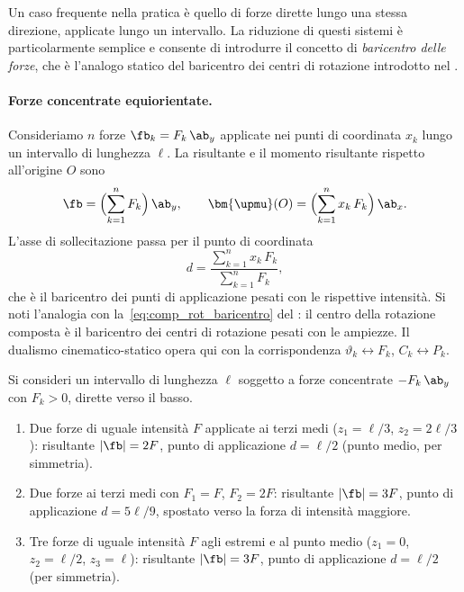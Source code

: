 Un caso frequente nella pratica  è quello di forze
dirette lungo una stessa direzione, applicate lungo un
intervallo. La riduzione di questi sistemi è particolarmente
semplice e consente di introdurre il concetto di
\textit{baricentro delle forze}, che è l'analogo statico del
baricentro dei centri di rotazione introdotto nel .

\paragraph{Forze concentrate equiorientate.}
Consideriamo $n$ forze $\fb_k = F_k\,\ab_y$ applicate nei
punti di coordinata $x_k$ lungo un intervallo di lunghezza
$\ell$. La risultante e il momento risultante rispetto
all'origine $O$ sono
\begin{equation}
	\fb = \Bigl(\sum_{k=1}^{n} F_k\Bigr)\,\ab_y, \qquad
	\bm{\upmu}(O) = \Bigl(\sum_{k=1}^{n} x_k\,F_k\Bigr)
	\,\ab_x.
\end{equation}
L'asse di sollecitazione passa per il punto di coordinata
\begin{equation}\label{eq:baricentro_forze}
	d = \frac{\displaystyle\sum_{k=1}^{n} x_k\,F_k}
	{\displaystyle\sum_{k=1}^{n} F_k},
\end{equation}
che è il baricentro dei punti di applicazione pesati con le
rispettive intensità. Si noti l'analogia con
la~\eqref{eq:comp_rot_baricentro} del : il
centro della rotazione composta è il baricentro dei centri
di rotazione pesati con le ampiezze. Il dualismo
cinematico-statico opera qui con la corrispondenza
$\vartheta_k \leftrightarrow F_k$,
$C_k \leftrightarrow P_k$.

\begin{esempio}
	Si consideri un intervallo di lunghezza $\ell$ soggetto a
	forze concentrate $-F_k\,\ab_y$ con $F_k > 0$, dirette verso
	il basso.
	\begin{enumerate}[label=(\alph*)]
		\item Due forze di uguale intensità $F$ applicate ai
		terzi medi ($z_1 = \ell/3$, $z_2 = 2\ell/3$):
		risultante $|\fb| = 2F$, punto di applicazione
		$d = \ell/2$ (punto medio, per simmetria).
		\item Due forze ai terzi medi con $F_1 = F$,
		$F_2 = 2F$: risultante $|\fb| = 3F$, punto di
		applicazione $d = 5\ell/9$, spostato verso la forza di
		intensità maggiore.
		\item Tre forze di uguale intensità $F$ agli estremi e
		al punto medio ($z_1 = 0$, $z_2 = \ell/2$,
		$z_3 = \ell$): risultante $|\fb| = 3F$, punto di
		applicazione $d = \ell/2$ (per simmetria).
	\end{enumerate}



\end{esempio}


